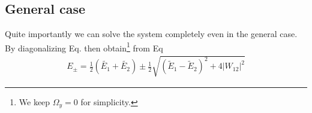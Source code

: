 \subsection{General case}

Quite importantly we can solve the system completely even in the general case. By diagonalizing  Eq. \eWe then obtain\footnote{We keep $\Omega_y =0$ for simplicity.} from Eq
\begin{align}\label{eq:Epm}
 E_\pm = \frac{1}{2}\left(\tilde{E_1}+\tilde{E_2}\right) \pm \frac{1}{2} \sqrt{\left(\tilde{E}_1-\tilde{E}_2\right)^2+4 \left|W_{12}\right|^2}
\end{align}